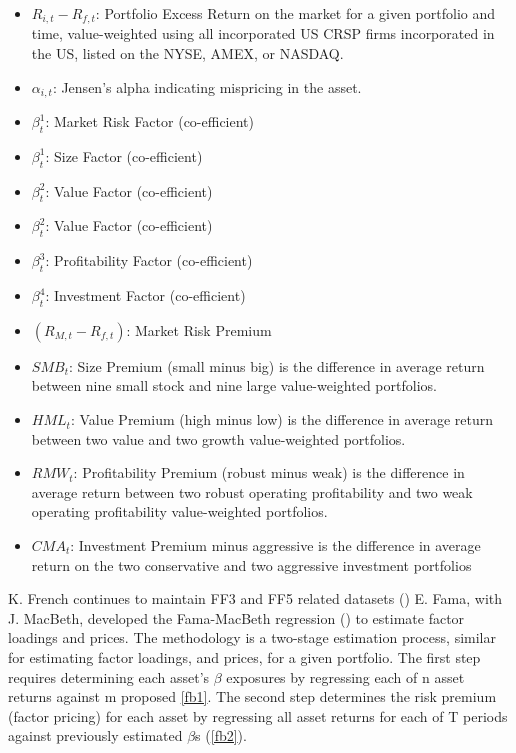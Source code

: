 \documentclass[12pt]{article}
\begin{document}
\begin{itemize} 
	\item $R_{i,t} - R_{f,t}$: Portfolio Excess Return on the market for a given portfolio and time, value-weighted using all incorporated US CRSP firms incorporated in the US, listed on the NYSE, AMEX, or NASDAQ.
	\item $\alpha_{i,t}$: Jensen's alpha indicating mispricing in the asset.
	\item $\beta_{t}^{1}$: Market Risk Factor (co-efficient)
	\item $\beta_{t}^{1}$: Size Factor (co-efficient)
	\item $\beta_{t}^{2}$: Value Factor (co-efficient)
	\item $\beta_{t}^{2}$: Value Factor (co-efficient)
	\item $\beta_{t}^{3}$: Profitability Factor (co-efficient)
	\item $\beta_{t}^{4}$: Investment Factor (co-efficient)
	\item $(R_{M,t}-R_{f,t})$: Market Risk Premium
	\item $SMB_{t}$: Size Premium (small minus big) is the difference in average return between nine small stock and nine large value-weighted portfolios.
	\item $HML_{t}$: Value Premium (high minus low) is the difference in average return between two value and two growth value-weighted portfolios.
	\item $RMW_{t}$: Profitability Premium (robust minus weak) is the difference in average return between two robust operating profitability and two weak operating profitability value-weighted portfolios.
	\item $CMA_{t}$: Investment Premium minus aggressive is the difference in average return on the two conservative and two aggressive investment portfolios
\end{itemize}
K. French continues to maintain FF3 and FF5 related datasets (\cite{french-personal})
E. Fama, with J. MacBeth, developed the Fama-MacBeth regression (\cite{fama1973risk}) to estimate factor loadings and prices.
The methodology is a two-stage estimation process, similar for estimating factor loadings, and prices, for a given portfolio.
The first step requires determining each asset's $\beta$ exposures by regressing each of n asset returns against m proposed \ref{fb1}.
The second step determines the risk premium (factor pricing) for each asset by regressing all asset returns for each of T periods against previously estimated $\beta$s (\ref{fb2}).
\end{document}
